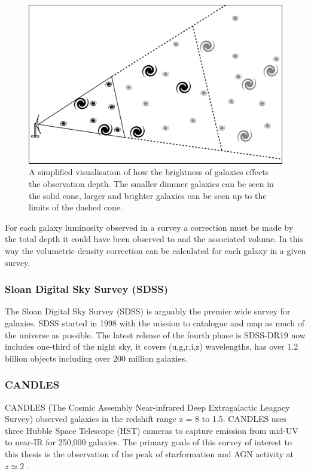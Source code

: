 \begin{figure}[h]
    \centering
    \includegraphics[width = \linewidth]{Figures/Chapter1/Vmax_Toon.png}
    \caption{A simplified visualisation of how the brightness of galaxies effects the observation depth. The smaller dimmer galaxies can be seen in the solid cone, larger and brighter galaxies can be seen up to the limits of the dashed cone.}
    \label{fig:Vmax}
\end{figure}

For each galaxy luminosity observed in a survey a correction must be made by the total depth it could have been observed to and the associated volume. In this way the volumetric density correction can be calculated for each galaxy in a given survey.

\subsubsection{Sloan Digital Sky Survey (SDSS)}

The Sloan Digital Sky Survey (SDSS) is arguably the premier wide survey for galaxies. SDSS started in 1998 with the mission to catalogue and map as much of the universe as possible. The latest release of the fourth phase is SDSS-DR19 \citep{Ahumada2019TheSpectra} now includes one-third of the night sky, it covers (u,g,r,i,z) wavelengths, has over 1.2 billion objects including over 200 million galaxies.

\subsubsection{CANDLES}
CANDLES (The Cosmic Assembly Near-infrared Deep Extragalactic Leagacy Survey) observed galaxies in the redshift range z = 8 to 1.5. CANDLES uses three Hubble Space Telescope (HST) cameras to capture emission from mid-UV to near-IR for 250,000 galaxies. The primary goals of this survey of interest to this thesis is the observation of the peak of starformation and AGN activity at $z \simeq 2$ \cite{Grogin2011Candels:Survey}.

